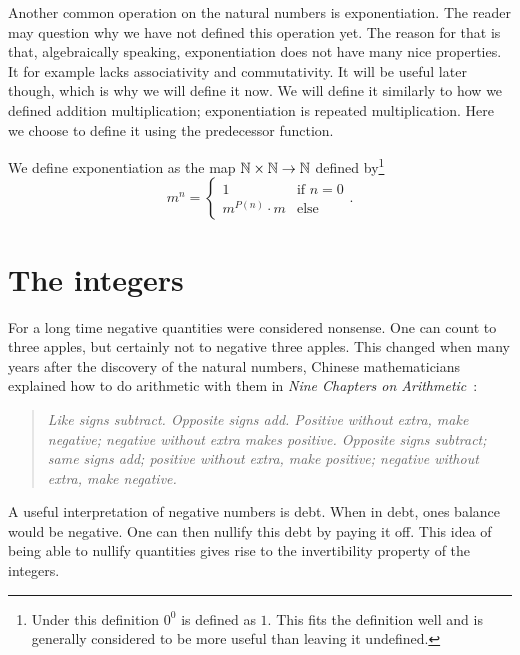 \documentclass[../main.tex]{subfiles}
\begin{document}
Another common operation on the natural numbers is exponentiation. The reader may question why we have not defined this operation yet. The reason for that is that, algebraically speaking, exponentiation does not have many nice properties. It for example lacks associativity and commutativity. It will be useful later though, which is why we will define it now. We will define it similarly to how we defined addition multiplication; exponentiation is repeated multiplication. Here we choose to define it using the predecessor function.
\begin{definition}\label{dfn:the_natural_numbers_integers_and_rational_numbers:N_exponentiation}
    We define exponentiation as the map $\mathbb{N}\times\mathbb{N}\to\mathbb{N}$ defined by\footnote{Under this definition $0^0$ is defined as $1$. This fits the definition well and is generally considered to be more useful than leaving it undefined.}
    \begin{equation*}
        m^n=
        \begin{cases}
            1 & \text{if }n=0 \\
            m^{P(n)}\cdot m & \text{else}
        \end{cases}.
    \end{equation*}
\end{definition}

\section{The integers}\label{sec:the_natural_numbers_integers_and_rational_numbers:the_integers}
For a long time negative quantities were considered nonsense. One can count to three apples, but certainly not to negative three apples. This changed when many years after the discovery of the natural numbers, Chinese mathematicians explained how to do arithmetic with them in \textit{Nine Chapters on Arithmetic}~\cite{NineChapters20}:
\begin{quote}
\end{quote}
\begin{quote}
    \textit{Like signs subtract. Opposite signs add. Positive without extra, make negative; negative without extra makes positive. Opposite signs subtract; same signs add; positive without extra, make positive; negative without extra, make negative.}
\end{quote}
A useful interpretation of negative numbers is debt. When in debt, ones balance would be negative. One can then nullify this debt by paying it off. This idea of being able to nullify quantities gives rise to the invertibility property of the integers.
\end{document}
